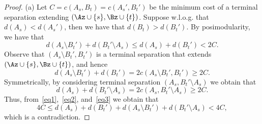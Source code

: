\begin{proof}
\noindent (a) Let $C=c(A_s,B_t)=c(A_s',B_t')$ be the minimum cost of a terminal separation extending $(\Az\cup \{s\},\Bz\cup \{t\})$. Suppose w.l.o.g. that $d(A_s)<d(A_s')$, then we have that $d(B_t)>d(B_t')$. By posimodularity, we have that
\begin{equation}\label{eq1}
d(A_s\setminus B_t')+d(B_t'\setminus A_s)\leq d(A_s)+d(B_t')<2C.
\end{equation}
Observe that $(A_s\setminus B_t',B_t')$ is a terminal separation that extends $(\Az\cup \{s\},\Bz\cup \{t\})$, and hence 
\begin{equation}\label{eq2}
d(A_s\setminus B_t')+d(B_t')=2c(A_s\setminus B_t',B_t')\geq 2C.
\end{equation}
Symmetrically, by considering terminal separation $(A_s,B_t'\setminus A_s)$ we obtain that
\begin{equation}\label{eq3}
d(A_s)+d(B_t'\setminus A_s)=2c(A_s,B_t'\setminus A_s)\geq 2C.
\end{equation}
Thus, from~\eqref{eq1},~\eqref{eq2}, and~\eqref{eq3} we obtain that
$$4C\leq d(A_s)+d(B_t')+d(A_s\setminus B_t')+d(B_t'\setminus A_s)<4C,$$
which is a contradiction.

\smallskip


\end{proof}
